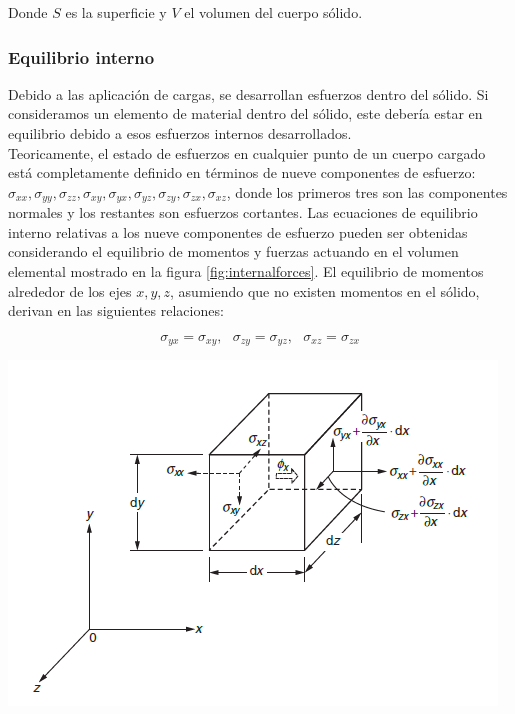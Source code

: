 Donde $S$ es la superficie y $V$ el volumen del cuerpo sólido.


\subsubsection{Equilibrio interno}

Debido a las aplicación de cargas, se desarrollan esfuerzos dentro del sólido. Si consideramos 
un elemento de material dentro del sólido, este debería estar en equilibrio debido a esos 
esfuerzos internos desarrollados.\\

Teoricamente, el estado de esfuerzos en cualquier punto de un cuerpo cargado está completamente definido 
en términos de nueve componentes de esfuerzo: $\sigma_{xx}, \sigma_{yy}, \sigma_{zz}, \sigma_{xy}, \sigma_{yx}, 
\sigma_{yz}, \sigma_{zy}, \sigma_{zx}, \sigma_{xz} $, donde los primeros tres son las componentes normales y los restantes 
son esfuerzos cortantes. Las ecuaciones de equilibrio interno relativas a los nueve componentes de esfuerzo pueden ser 
obtenidas considerando el equilibrio de momentos y fuerzas actuando en el volumen elemental mostrado en 
la figura \ref{fig:internalforces}. El equilibrio de momentos alrededor de los ejes $x,y,z$, asumiendo que no existen 
momentos en el sólido, derivan en las siguientes relaciones:

\begin{equation}
\sigma_{yx} = \sigma_{xy}, \,\,\,\, \sigma_{zy} = \sigma_{yz}, \,\,\,\, \sigma_{xz} = \sigma_{zx}
\end{equation}

\begin{center}
\includegraphics[scale]{src/internal_force.png}
\label{fig:internalforces}
\end{center}

